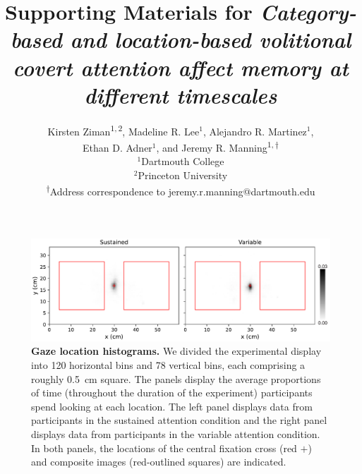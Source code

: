 \documentclass{article}
\begin{document}
\title{Supporting Materials for \textit{Category-based and location-based volitional covert attention affect
memory at different timescales}}

\author{Kirsten Ziman\textsuperscript{$1, 2$},
Madeline R. Lee$^1$,
Alejandro R. Martinez$^1$,\\
Ethan D. Adner$^1$,
and
Jeremy R. Manning\textsuperscript{$1, \dagger$}\\[0.1in]$^1$Dartmouth College\\
$^2$Princeton University\\
\textsuperscript{$\dagger$}Address correspondence to jeremy.r.manning@dartmouth.edu}


\maketitle


\renewcommand{\thefigure}{S\arabic{figure}}


  \begin{figure}[tp]
	\centering
	\includegraphics[width=1\textwidth]{figs/gaze_locations}
  
 \caption{\textbf{Gaze location histograms.} We divided the experimental
 display into 120 horizontal bins and 78 vertical bins, each comprising a
 roughly 0.5~cm square. The panels display the average proportions of time
 (throughout the duration of the experiment) participants spend looking at each
 location. The left panel displays data from participants in the sustained
 attention condition and the right panel displays data from participants in the
 variable attention condition. In both panels, the locations of the central
 fixation cross (red $+$) and composite images (red-outlined squares) are
 indicated.}
  
  \label{fig:gaze-histograms}
  \end{figure}
\end{document}
